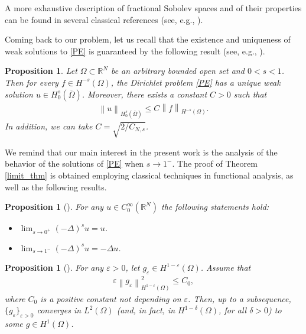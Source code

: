 \documentclass[reqno,twoside]{amsart}
\newtheorem{proposition}[theorem]{Proposition}
\numberwithin{equation}{section}
\def\RR{{\mathbb{R}}}
\newcommand{\norm}[2]{{\left\|#1\right\|}_{#2}}
\newcommand{\fl}[2]{(-\Delta)^#1#2}
\newcommand{\cns}{C_{N,s}}
\begin{document}
A more exhaustive description of fractional Sobolev spaces and of their properties can be found in several classical references (see, e.g., \cite{adams2003sobolev,dihitchhiker,jllions1972non}).

Coming back to our problem, let us recall that the existence and uniqueness of weak solutions to \eqref{PE} is guaranteed by the following result (see, e.g., \cite[Proposition 1.2.23]{peradottolaplaciano}).

\begin{proposition}\label{prop-ex}
Let $\Omega\subset\RR^N$ be an arbitrary bounded open set and $0<s<1$. Then for every $f\in H^{-s}(\Omega)$, the Dirichlet problem \eqref{PE} has a unique weak solution $u\in H_0^s(\overline{\Omega})$. Moreover, there exists a constant $C>0$ such that
\begin{align}\label{est-sol}
	\norm{u}{H_0^s(\overline{\Omega})}\le C\norm{f}{H^{-s}(\Omega)}.
\end{align}
In addition, we can take $C=\sqrt{2/\cns}$. 
\end{proposition}

We remind that our main interest in the present work is the analysis of the behavior of the solutions of \eqref{PE} when $s\to 1^-$. The proof of Theorem \ref{limit_thm} is obtained employing classical techniques in functional analysis, as well as the following results.

\begin{proposition}[{\cite[Proposition 4.4]{dihitchhiker}}]\label{limit_prop}
For any $u\in C_0^\infty(\RR^N)$ the following statements hold:
\begin{itemize}
	\item[(i)] $\lim_{s\to 0^+}\fl{s}{u} = u$.
	\item[(ii)] $\lim_{s\to 1^-} \fl{s}{u} = -\Delta u$.
\end{itemize}
\end{proposition}

\begin{proposition}[{\cite[Corollary 7]{bourgain2001another}}]\label{brezis_prop}
For any $\varepsilon>0$, let $g_\varepsilon \in H^{1-\varepsilon}(\Omega)$. Assume that 
\begin{align*}
	\varepsilon\norm{g_\varepsilon}{H^{1-\varepsilon}(\Omega)}^2\leq C_0,
\end{align*}
where $C_0$ is a positive constant not depending on $\varepsilon$. Then, up to a subsequence, $\{g_\varepsilon\}_{\varepsilon>0}$ converges in $L^2(\Omega)$ (and, in fact, in $H^{1-\delta}(\Omega)$, for all $\delta > 0$) to some $g\in H^1(\Omega)$.
\end{proposition}
\end{document}
